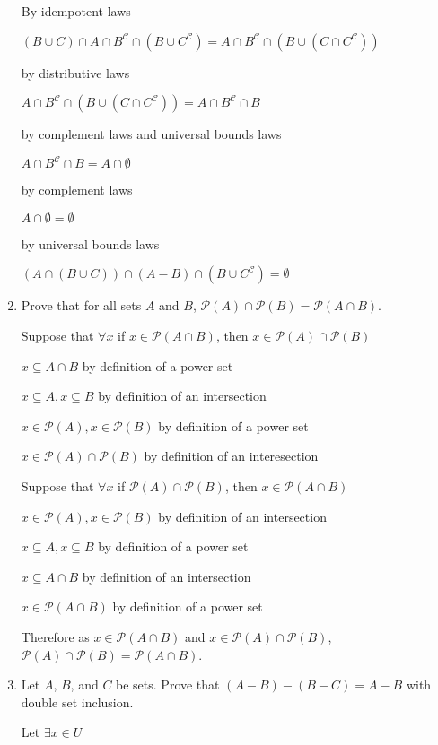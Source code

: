 \documentclass[12pt,letterpaper,titlepage]{article}
\begin{document}
\begin{raggedright}
\begin{enumerate}
By idempotent laws

$(B\cup C)\cap A\cap B^\mathcal{C}\cap (B\cup C^\mathcal{C}) = A\cap B^\mathcal{C}\cap (B\cup(C\cap C^\mathcal{C}))$

by distributive laws

$A\cap B^\mathcal{C}\cap (B\cup(C\cap C^\mathcal{C})) = A\cap B^\mathcal{C}\cap B$

by complement laws and universal bounds laws

$A\cap B^\mathcal{C}\cap B = A\cap \emptyset$

by complement laws

$A\cap \emptyset = \emptyset$

by universal bounds laws

 $(A\cap(B\cup C))\cap(A-B)\cap(B\cup C^\mathcal{C}) = \emptyset$

\clearpage

\item Prove that for all sets $A$ and $B$, $\mathcal{P}(A)\cap \mathcal{P}(B) = \mathcal{P}(A\cap B)$.

Suppose that $\forall x$ if $x\in \mathcal{P}(A\cap B)$, then $x\in \mathcal{P}(A)\cap \mathcal{P}(B)$

$x \subseteq A\cap B$ by definition of a power set

$x \subseteq A, x\subseteq B$ by definition of an intersection

$x\in \mathcal{P}(A), x\in\mathcal{P}(B)$ by definition of a power set

$x\in \mathcal{P}(A)\cap \mathcal{P}(B)$ by definition of an interesection

Suppose that $\forall x$ if $\mathcal{P}(A)\cap \mathcal{P}(B)$, then $x\in \mathcal{P}(A\cap B)$

$x\in \mathcal{P}(A), x\in\mathcal{P}(B)$ by definition of an intersection

$x \subseteq A, x\subseteq B$ by definition of a power set

$x \subseteq A\cap B$ by definition of an intersection

$x\in \mathcal{P}(A\cap B)$ by definition of a power set

Therefore as $x\in \mathcal{P}(A\cap B)$ and $x\in \mathcal{P}(A)\cap \mathcal{P}(B)$, $\mathcal{P}(A)\cap \mathcal{P}(B) = \mathcal{P}(A\cap B)$.


\item Let $A$, $B$, and $C$ be sets. Prove that $(A-B)-(B-C)=A-B$ with double set inclusion.

Let $\exists x \in U$


\end{enumerate}
\end{raggedright}
\end{document}
